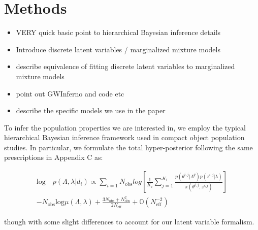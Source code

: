 \section{Methods} \label{sec:methods}

\begin{itemize}
    \item VERY quick basic point to hierarchical Bayesian inference details
    \item Introduce discrete latent variables / marginalized mixture models
    \item describe equivalence of fitting discrete latent variables to marginalized mixture models
    \item point out GWInferno and code etc
    \item describe the specific models we use in the paper
\end{itemize}

To infer the population properties we are interested in, we employ the typical hierarchical Bayesian inference framework used in compact object population studies. In particular, we formulate the total hyper-posterior following the same prescriptions in  Appendix C as:

\begin{align}
    \text{log} \quad p(\Lambda, \lambda | {d_i}) \propto \sum_{i=1}{N_\text{obs}} log \left[ \frac{1}{K_i} \sum_{j=1}^{K_i} \frac{p(\theta^{i,j} | \Lambda^q) p(z^{i,j} | \lambda)}{\pi (\theta^{i,j}, z^{i,j})} \right] \\ - N_\text{obs} \text{log} \mu(\Lambda, \lambda) + \frac{3N_\text{obs}+N^2_{\text{obs}}}{2N_{\text{eff}}} + \mathbb{O}(N^{-2}_{\text{eff}})
\end{align}

though with some slight differences to account for our latent variable formalism. 